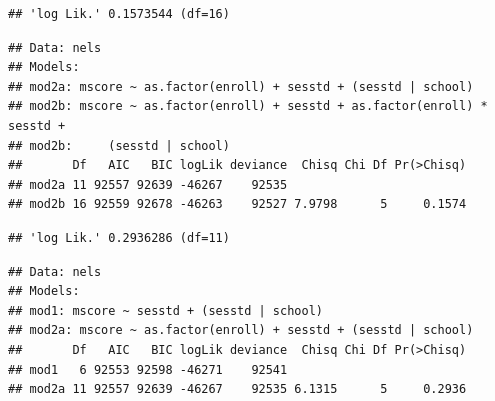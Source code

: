 \documentclass[ignorenonframetext,]{beamer}
\begin{document}
\begin{frame}[fragile]{}

\begin{verbatim}
## 'log Lik.' 0.1573544 (df=16)
\end{verbatim}

\begin{verbatim}
## Data: nels
## Models:
## mod2a: mscore ~ as.factor(enroll) + sesstd + (sesstd | school)
## mod2b: mscore ~ as.factor(enroll) + sesstd + as.factor(enroll) * sesstd + 
## mod2b:     (sesstd | school)
##       Df   AIC   BIC logLik deviance  Chisq Chi Df Pr(>Chisq)
## mod2a 11 92557 92639 -46267    92535                         
## mod2b 16 92559 92678 -46263    92527 7.9798      5     0.1574
\end{verbatim}

\begin{verbatim}
## 'log Lik.' 0.2936286 (df=11)
\end{verbatim}

\begin{verbatim}
## Data: nels
## Models:
## mod1: mscore ~ sesstd + (sesstd | school)
## mod2a: mscore ~ as.factor(enroll) + sesstd + (sesstd | school)
##       Df   AIC   BIC logLik deviance  Chisq Chi Df Pr(>Chisq)
## mod1   6 92553 92598 -46271    92541                         
## mod2a 11 92557 92639 -46267    92535 6.1315      5     0.2936
\end{verbatim}


\end{frame}
\end{document}
